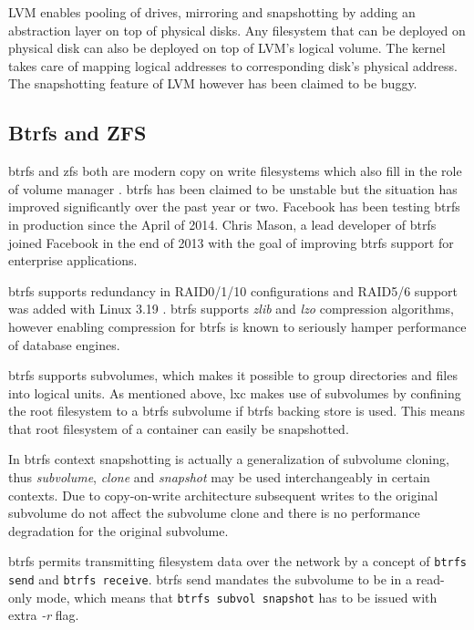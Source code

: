 \documentclass[a4paper,11pt]{kth-mag}
\begin{document}
LVM enables pooling of drives, mirroring and snapshotting by adding
an abstraction layer on top of physical disks. Any filesystem that
can be deployed on physical disk can also be deployed on top of
LVM's logical volume. The kernel takes care of mapping logical
addresses to corresponding disk's physical address.
The snapshotting feature of LVM however has been claimed to be buggy.
\cite{fedora-and-lvm}


\subsection{Btrfs and ZFS}

\acrshort{btrfs} and \acrfull{zfs} both are modern copy on write filesystems
which also fill in the role of volume manager
\cite{btrfs-the-linux-b-tree-filesystem}
\cite{chris-mason-the-btrfs-filesystem}.
\acrshort{btrfs} has been claimed to be unstable but the situation has
improved significantly over the past year or two.
Facebook has been testing \acrshort{btrfs} in production since the April of 2014.
\cite{btrfs-production-users}
Chris Mason, a lead developer of \acrshort{btrfs} joined Facebook
in the end of 2013 with the goal of improving \acrshort{btrfs} support
for enterprise applications.
\cite{leaving-fusionio}

\acrshort{btrfs} supports redundancy in RAID0/1/10 configurations and
RAID5/6 support was added with Linux 3.19 \cite{btrfs-for-3.19}.
\acrshort{btrfs} supports \emph{zlib} and \emph{lzo} compression algorithms,
however enabling compression for \acrshort{btrfs} is known to
seriously hamper performance of database engines.

\acrshort{btrfs} supports subvolumes, which makes it possible to group
directories and files into logical units.
As mentioned above, \acrshort{lxc} makes use of subvolumes
by confining the root filesystem to a \acrshort{btrfs} subvolume
if \acrshort{btrfs} backing store is used.
This means that root filesystem of a container
can easily be snapshotted.

In \acrshort{btrfs} context snapshotting is actually
a generalization of subvolume cloning,
thus \emph{subvolume}, \emph{clone} and \emph{snapshot} may be used
interchangeably in certain contexts.
Due to copy-on-write architecture subsequent writes
to the original subvolume do not affect
the subvolume clone and there is no performance
degradation for the original subvolume.

\acrshort{btrfs} permits transmitting filesystem data over the network
by a concept of \lstinline!btrfs send! and \lstinline!btrfs receive!.
\acrshort{btrfs} send mandates the subvolume to be in a read-only mode,
which means that \lstinline!btrfs subvol snapshot! has to be issued
with extra \emph{-r} flag.
\end{document}
